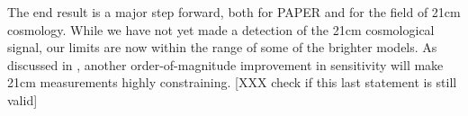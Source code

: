 \documentclass[twocolumn,numberedappendix]{emulateapj} \shorttitle{PSA64}
\begin{document}
The end result is a major step forward, both for PAPER and for the field of 21cm cosmology.
While we have not yet made a detection of the 21cm cosmological signal, our limits are
now within the range of some of the brighter models.  As discussed in \citet{pober_et_al2015},
another order-of-magnitude improvement in sensitivity will make 21cm measurements highly constraining.
[XXX check if this last statement is still valid]



%
%
%
\end{document}
